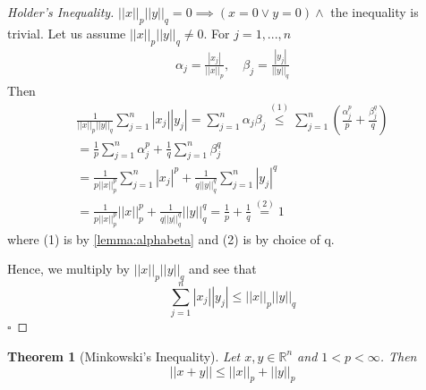 \documentclass[11pt, oneside]{book}
\theoremstyle{break}
\newtheorem{thm}{Theorem}[section]
\newtheorem*{proof}{Proof}
\newcommand{\bb}[1]{\mathbb{#1}}			%
\newcommand{\qed}{\hfill\ensuremath{\square}}	%
\begin{document}
\begin{proof}[Holder's Inequality]
	$||x||_p ||y||_q = 0 \implies (x = 0 \lor y = 0) \land $ the inequality is trivial. Let us assume $||x||_p ||y||_q \neq 0$. For $j = 1, ..., n$
	\begin{gather*}
		\alpha_j = \frac{|x_j|}{||x||_p}, \quad \beta_j = \frac{|y_j|}{||y||_q}
	\end{gather*}
	Then
	\begin{gather*}
		\frac{1}{||x||_p ||y||_q} \sum_{j=1}^{n} |x_j||y_j| = \sum_{j=1}^{n} \alpha_j \beta_j \overset{(1)}{\leq} \sum_{j=1}^{n} \left( \frac{\alpha_j^p}{p} + \frac{\beta_j^q}{q} \right) \\
		= \frac{1}{p} \sum_{j=1}^{n} \alpha_j^p + \frac{1}{q} \sum_{j=1}^{n} \beta_j^q \\
		= \frac{1}{p||x||_p^p} \sum_{j=1}^{n} |x_j|^p + \frac{1}{q ||y||_q^q} \sum_{j=1}^{n} |y_j|^q \\
		= \frac{1}{p ||x||_p^p} ||x||_p^p + \frac{1}{q ||y||_q^q} ||y||_q^q = \frac{1}{p} + \frac{1}{q} \overset{(2)}{=} 1
	\end{gather*}
	where (1) is by \autoref{lemma:alphabeta} and (2) is by choice of q.

	Hence, we multiply by $||x||_p ||y||_q$ and see that
	\begin{equation}
		\sum_{j=1}^{n} |x_j||y_j| \leq ||x||_p ||y||_q
	\end{equation}\qed
\end{proof}

\begin{thm}[Minkowski's Inequality]\label{thm:minkowski}
	Let $x, y \in \bb{R}^n$ and $1 < p < \infty$. Then
	\begin{equation}
		||x + y|| \leq ||x||_p + ||y||_p
	\end{equation}
\end{thm}
\end{document}
